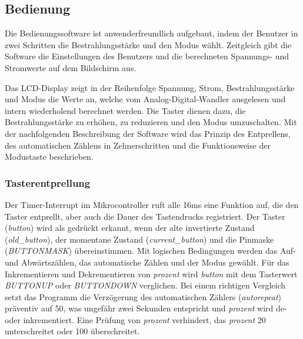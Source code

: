 \subsection{Bedienung}
Die Bedienungssoftware ist anwenderfreundlich aufgebaut, indem der Benutzer in zwei Schritten die Bestrahlungsstärke und den Modus wählt. Zeitgleich gibt die Software die Einstellungen des Benutzers und die berechneten Spannungs- und Stromwerte auf dem Bildschirm aus.

Das LCD-Display zeigt in der Reihenfolge Spannung, Strom, Bestrahlungsstärke und Modus die Werte an, welche vom Analog-Digital-Wandler ausgelesen und intern wiederholend berechnet werden. Die Taster dienen dazu, die Bestrahlungsstärke zu erhöhen, zu reduzieren und den Modus umzuschalten. Mit der nachfolgenden Beschreibung der Software wird das Prinzip des Entprellens, des automatischen Zählens in Zehnerschritten und die Funktionsweise der Modustaste beschrieben.

\subsubsection{Tasterentprellung}
Der Timer-Interrupt im Mikrocontroller ruft alle 16ms eine Funktion auf, die den Taster entprellt, aber auch die Dauer des Tastendrucks registriert.
Der Taster (\textit{button}) wird als gedrückt erkannt, wenn der alte invertierte Zustand (\textit{old\_button}), der momentane Zustand (\textit{current\_button}) und die Pinmaske (\textit{BUTTONMASK}) übereinstimmen.
Mit logischen Bedingungen werden das Auf- und Abwärtszählen, das automatische Zählen und der Modus gewählt. Für das Inkrementieren und Dekrementieren von \textit{prozent} wird \textit{button} mit dem Tasterwert \textit{BUTTONUP} oder \textit{BUTTONDOWN} verglichen. Bei einem richtigen Vergleich setzt das Programm die Verzögerung des automatischen Zählers (\textit{autorepeat}) präventiv auf 50, was ungefähr zwei Sekunden entspricht und \textit{prozent} wird de- oder inkrementiert. Eine Prüfung von \textit{prozent} verhindert, das \textit{prozent} 20 unterschreitet oder 100 überschreitet.

